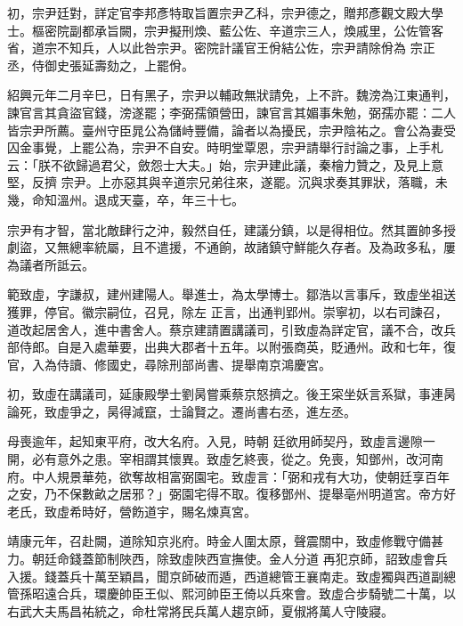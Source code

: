 \begin{pinyinscope}
 初，宗尹廷對，詳定官李邦彥特取旨置宗尹乙科，宗尹德之，贈邦彥觀文殿大學士。樞密院副都承旨闕，宗尹擬刑煥、藍公佐、辛道宗三人，煥戚里，公佐管客省，道宗不知兵，人以此咎宗尹。密院計議官王佾結公佐，宗尹請除佾為
 宗正丞，侍御史張延壽劾之，上罷佾。



 紹興元年二月辛巳，日有黑子，宗尹以輔政無狀請免，上不許。魏滂為江東通判，諫官言其貪盜官錢，滂遂罷；李弼孺領營田，諫官言其媚事朱勉，弼孺亦罷：二人皆宗尹所薦。臺州守臣晁公為儲峙豐備，論者以為擾民，宗尹陰祐之。會公為妻受囚金事覺，上罷公為，宗尹不自安。時明堂覃恩，宗尹請舉行討論之事，上手札云：「朕不欲歸過君父，斂怨士大夫。」始，宗尹建此議，秦檜力贊之，及見上意堅，反擠
 宗尹。上亦惡其與辛道宗兄弟往來，遂罷。沉與求奏其罪狀，落職，未幾，命知溫州。退成天臺，卒，年三十七。



 宗尹有才智，當北敵肆行之沖，毅然自任，建議分鎮，以是得相位。然其置帥多授劇盜，又無總率統屬，且不遣援，不通餉，故諸鎮守鮮能久存者。及為政多私，屢為議者所詆云。



 範致虛，字謙叔，建州建陽人。舉進士，為太學博士。鄒浩以言事斥，致虛坐祖送獲罪，停官。徽宗嗣位，召見，除左
 正言，出通判郢州。崇寧初，以右司諫召，道改起居舍人，進中書舍人。蔡京建請置講議司，引致虛為詳定官，議不合，改兵部侍郎。自是入處華要，出典大郡者十五年。以附張商英，貶通州。政和七年，復官，入為侍讀、修國史，尋除刑部尚書、提舉南京鴻慶宮。



 初，致虛在講議司，延康殿學士劉昺嘗乘蔡京怒擠之。後王寀坐妖言系獄，事連昺論死，致虛爭之，昺得減竄，士論賢之。遷尚書右丞，進左丞。



 母喪逾年，起知東平府，改大名府。入見，時朝
 廷欲用師契丹，致虛言邊隙一開，必有意外之患。宰相謂其懷異。致虛乞終喪，從之。免喪，知鄧州，改河南府。中人規景華苑，欲奪故相富弼園宅。致虛言：「弼和戎有大功，使朝廷享百年之安，乃不保數畝之居邪？」弼園宅得不取。復移鄧州、提舉亳州明道宮。帝方好老氏，致虛希時好，營飭道宇，賜名煉真宮。



 靖康元年，召赴闕，道除知京兆府。時金人圍太原，聲震關中，致虛修戰守備甚力。朝廷命錢蓋節制陜西，除致虛陜西宣撫使。金人分道
 再犯京師，詔致虛會兵入援。錢蓋兵十萬至穎昌，聞京師破而遁，西道總管王襄南走。致虛獨與西道副總管孫昭遠合兵，環慶帥臣王似、熙河帥臣王倚以兵來會。致虛合步騎號二十萬，以右武大夫馬昌祐統之，命杜常將民兵萬人趨京師，夏俶將萬人守陵寢。




\end{pinyinscope}
